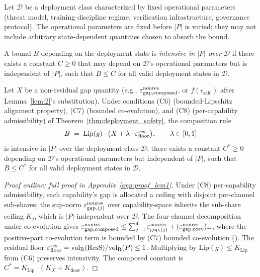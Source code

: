 \begin{definition}
\label{def:intensive_paper10}
Let $\mathcal{D}$ be a deployment class characterized by fixed
operational parameters (threat model, training-discipline regime,
verification infrastructure, governance protocol).  The operational
parameters are fixed before $|P|$ is varied; they may not include
arbitrary state-dependent quantities chosen to absorb the bound.

A bound $B$ depending on the deployment state is \emph{intensive in
$|P|$ over $\mathcal{D}$} if there exists a constant $C \geq 0$
that may depend on $\mathcal{D}$'s operational parameters but is
independent of $|P|$, such that $B \leq C$ for all valid deployment
states in $\mathcal{D}$.
\end{definition}

\begin{lemma}
\label{lem:1}
Let $X$ be a non-residual gap quantity (e.g., $\varepsilon_{\mathrm{gap},\mathrm{composed}}^{\mathrm{nonres}}$,
or $f(\epsilon_{\mathrm{safe}})$ after Lemma~\ref{lem:2}'s
substitution).  Under conditions (C6) (bounded-Lipschitz alignment
property), (C7) (bounded co-evolution), and (C8) (per-capability
admissibility) of Theorem~\ref{thm:deployment_safety}, the
composition rule
\[
  B \;=\; \mathrm{Lip}(g) \cdot \bigl(X + \lambda \cdot \varepsilon_{\mathrm{floor}}^{\mathrm{res}}\bigr),
  \qquad \lambda \in [0, 1]
\]
is intensive in $|P|$ over the deployment class $\mathcal{D}$:
there exists a constant $C^* \geq 0$ depending on $\mathcal{D}$'s
operational parameters but independent of $|P|$, such that
$B \leq C^*$ for all valid deployment states in $\mathcal{D}$.
\end{lemma}

\begin{proof}[Proof outline; full proof in
Appendix~\ref{app:proof_lem1}]
Under (C8) per-capability admissibility, each capability's gap is
allocated a ceiling with disjoint per-channel sub-shares; the
sup-norm $\varepsilon_{\mathrm{gap},(j)}^{\mathrm{nonres}}$ over capability-space inherits the
sub-share ceiling $K_j$, which is $|P|$-independent over
$\mathcal{D}$. The four-channel decomposition under co-evolution
gives $\varepsilon_{\mathrm{gap},\mathrm{composed}}^{\mathrm{nonres}} \leq \sum_{j=1}^{4} \varepsilon_{\mathrm{gap},(j)}^{\mathrm{nonres}}
+ (\varepsilon_{\mathrm{gap},\mathrm{coev}}^{\mathrm{nonres}})_+$, where the positive-part co-evolution term is
bounded by (C7) bounded co-evolution
(\citep[Theorem~1]{lasser2026foundations}). The residual floor
$\varepsilon_{\mathrm{floor}}^{\mathrm{res}} = {\operatorname{vol}_{\mathrm{R}}}(\mathrm{ResS})/{\operatorname{vol}_{\mathrm{R}}}(P) \leq 1$. Multiplying by
$\mathrm{Lip}(g) \leq K_{\mathrm{Lip}}$ from (C6) preserves
intensivity.  The composed constant is $C^* = K_{\mathrm{Lip}}
\cdot (K_X + K_{\mathrm{floor}})$.
\end{proof}

